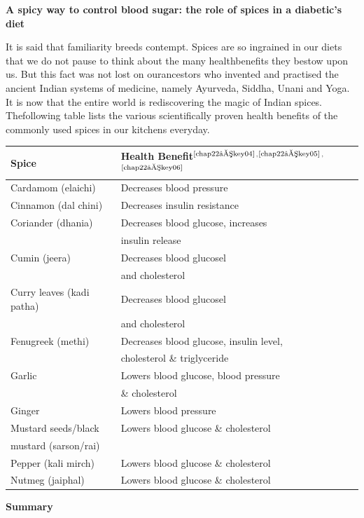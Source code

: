 \noindent\textbf{A spicy way to control blood sugar: the role of spices in a diabetic’s diet}

It is said that familiarity breeds contempt. Spices are so ingrained in our diets that we do not pause to think about the many health\break benefits they bestow upon us. But this fact was not lost on our\break ancestors who invented and practised the ancient Indian systems of medicine, namely Ayurveda, Siddha, Unani and Yoga. It is now that the entire world is rediscovering the magic of Indian spices. The\break following table lists the various scientifically proven health benefits of the commonly used spices in our kitchens everyday.

\vskip 6pt
\begin{longtable}{|l|l|}
\hline
\textbf{Spice} & \textbf{Health Benefit}$^{\text{\cite{chap22–key04}}}$$^,$$^{\text{\cite{chap22–key05}}}$$^,$$^{\text{\cite{chap22–key06}}}$\\
\hline
Cardamom (elaichi) & Decreases blood pressure\\
\hline
Cinnamon (dal chini) & Decreases insulin resistance\\
\hline
Coriander (dhania) & Decreases blood glucose, increases\\
 & insulin release\\
\hline
Cumin (jeera) & Decreases blood glucosel\\
 & and cholesterol\\
\hline
Curry leaves (kadi patha) & Decreases blood glucosel\\
 & and cholesterol\\
\hline
Fenugreek (methi) & Decreases blood glucose, insulin level,\\
 & cholesterol \& triglyceride\\
\hline
Garlic & Lowers blood glucose, blood pressure\\
 & \& cholesterol\\
\hline
Ginger & Lowers blood pressure\\
\hline
Mustard seeds/black & Lowers blood glucose \& cholesterol\\
\hline
mustard (sarson/rai) &\\
Pepper (kali mirch) & Lowers blood glucose \& cholesterol\\
\hline
Nutmeg (jaiphal) & Lowers blood glucose \& cholesterol\\
\hline
\end{longtable}

\noindent\textbf{Summary}

